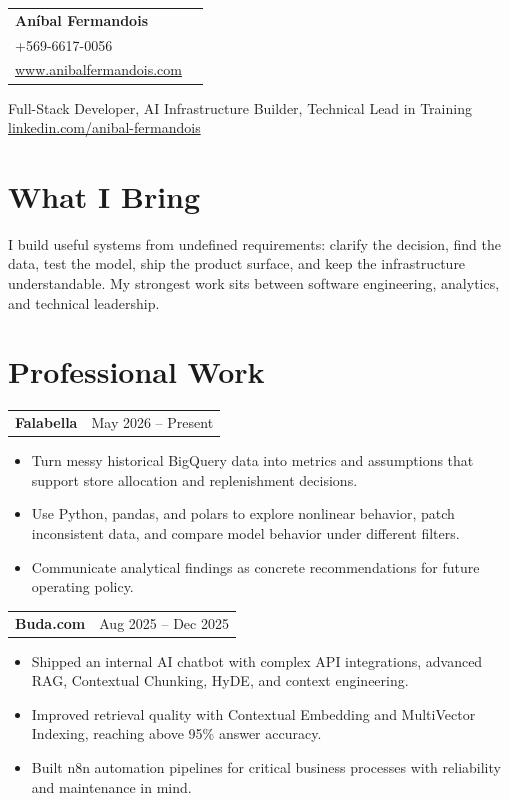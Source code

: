 \documentclass[10pt,letterpaper]{article}
\makeatletter
\newcommand{\job}[4]{%
  \begin{tabularx}{\linewidth}{@{}Xr@{}}
    {\bfseries #1} \quad {\color{accent}\textbf{#2}} & {\color{muted}#3} \\
  \end{tabularx}
  #4
}
\makeatother
\begin{document}
\color{ink}

\begin{tabularx}{\linewidth}{@{}Xr@{}}
{\fontsize{25}{27}\selectfont\bfseries Aníbal Fermandois} &
\begin{tabular}{r@{}}
\href{mailto:anibal.fermandois@gmail.com}{anibal.fermandois@gmail.com}\\
+569-6617-0056\\
\href{https://www.anibalfermandois.com/}{www.anibalfermandois.com}
\end{tabular}\\
\end{tabularx}
{\large Full-Stack Developer, AI Infrastructure Builder, Technical Lead in Training}\\
\vspace{3pt}
\href{https://www.linkedin.com/in/anibal-fermandois-224ab4262/}{linkedin.com/anibal-fermandois}

\section{What I Bring}
I build useful systems from undefined requirements: clarify the decision, find the data, test the model, ship the product surface, and keep the infrastructure understandable. My strongest work sits between software engineering, analytics, and technical leadership.

\section{Professional Work}
\job{Falabella}{Planning and Development Engineer}{May 2026 -- Present}{
\begin{itemize}
  \item Turn messy historical BigQuery data into metrics and assumptions that support store allocation and replenishment decisions.
  \item Use Python, pandas, and polars to explore nonlinear behavior, patch inconsistent data, and compare model behavior under different filters.
  \item Communicate analytical findings as concrete recommendations for future operating policy.
\end{itemize}}

\job{Buda.com}{Automation and AI Intern}{Aug 2025 -- Dec 2025}{
\begin{itemize}
  \item Shipped an internal AI chatbot with complex API integrations, advanced RAG, Contextual Chunking, HyDE, and context engineering.
  \item Improved retrieval quality with Contextual Embedding and MultiVector Indexing, reaching above 95\% answer accuracy.
  \item Built n8n automation pipelines for critical business processes with reliability and maintenance in mind.
\end{itemize}}
\end{document}
